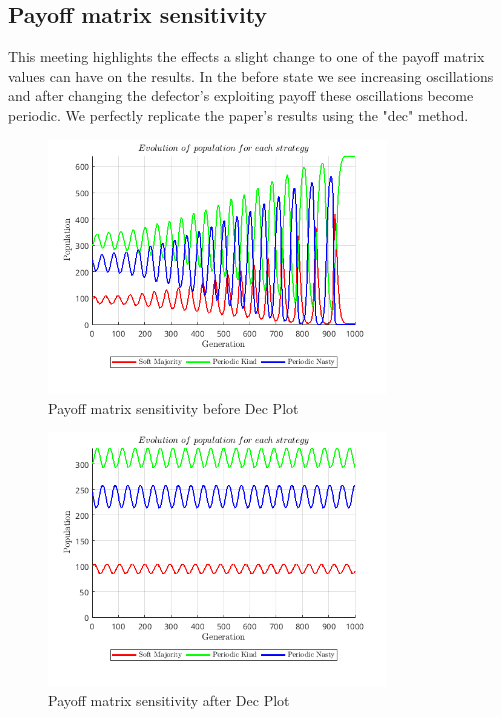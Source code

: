 \subsection{Payoff matrix sensitivity}
This meeting highlights the effects a slight change to one of the payoff matrix values can have on the results. In the before state we see increasing oscillations and after changing the defector's exploiting payoff these oscillations become periodic. We perfectly replicate the paper's results using the "dec" method. 
\begin{figure}[H]
    \centering
    \includegraphics[width=0.8\textwidth]{media/meetings/payoff_matrix_sensitivity_before_dec.png}
    \caption{Payoff matrix sensitivity before Dec Plot}
\end{figure}
\begin{figure}[H]
    \centering
    \includegraphics[width=0.8\textwidth]{media/meetings/payoff_matrix_sensitivity_after_dec.png}
    \caption{Payoff matrix sensitivity after Dec Plot}
\end{figure}

